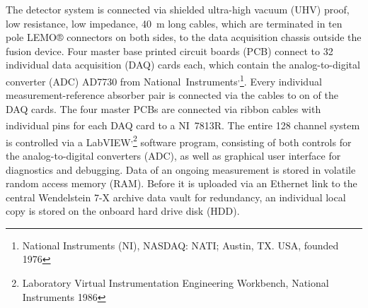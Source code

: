             The detector system is connected via shielded ultra-high vacuum (UHV) proof, low resistance, low impedance, \mbox{\SI{40}{\meter}} long cables, which are terminated in ten pole LEMO® connectors on both sides, to the data acquisition chassis outside the fusion device. Four master base printed circuit boards (PCB) connect to 32 individual data acquisition (DAQ) cards each, which contain the analog-to-digital converter (ADC) AD7730 from \mbox{National Instruments\textsuperscript{\textregistered,}}\footnote[1]{National Instruments (NI), NASDAQ: NATI; Austin, TX. USA, founded 1976}. Every individual measurement-reference absorber pair is connected via the cables to on of the DAQ cards. The four master PCBs are connected via ribbon cables with individual pins for each DAQ card to a \mbox{NI\textsuperscript{\textregistered} 7813R}. The entire 128 channel system is controlled via a \mbox{LabVIEW\textsuperscript{\textregistered,}}\footnote[2]{Laboratory Virtual Instrumentation Engineering Workbench, National Instruments 1986} software program, consisting of both controls for the analog-to-digital converters (ADC), as well as graphical user interface for diagnostics and debugging. Data of an ongoing measurement is stored in volatile random access memory (RAM). Before it is uploaded via an Ethernet link to the central Wendelstein 7-X archive data vault for redundancy, an individual local copy is stored on the onboard hard drive disk (HDD).%
%
